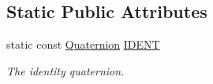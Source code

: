 \subsection*{Static Public Attributes}
\begin{DoxyCompactItemize}
\item 
\hypertarget{classgfxmath_1_1_quaternion_a077623f1e442ee4a48340cc966282a1e}{}static const \hyperlink{classgfxmath_1_1_quaternion}{Quaternion} \hyperlink{classgfxmath_1_1_quaternion_a077623f1e442ee4a48340cc966282a1e}{I\+D\+E\+N\+T}\label{classgfxmath_1_1_quaternion_a077623f1e442ee4a48340cc966282a1e}

\begin{DoxyCompactList}\small\item\em The identity quaternion. \end{DoxyCompactList}\end{DoxyCompactItemize}
